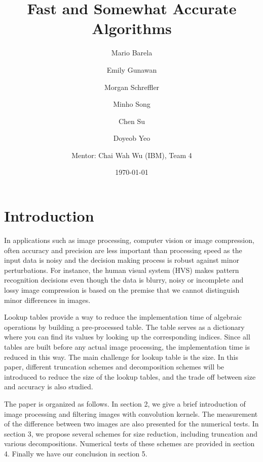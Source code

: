 \documentclass[12pt]{amsart}
\theoremstyle{definition}
\theoremstyle{remark}
\numberwithin{thm}{section}
\begin{document}
\title{Fast and Somewhat Accurate Algorithms}

\author[Barela]{Mario Barela}
\author[Gunawan]{Emily Gunawan}
\author[Schreffler]{Morgan Schreffler}
\author[Song]{Minho Song}
\author[Chen]{Chen Su}
\author[Yeo]{Doyeob Yeo}
\author[Wu]{Mentor: Chai Wah Wu (IBM), Team 4}

\address{Mathematical Modeling in Industry XIX (August 5-14, 2015)}

\date{\today}
\maketitle

\section{Introduction}%
In applications such as image processing, computer vision or image compression, often accuracy and precision are less important than processing speed as the input data is noisy and the decision making process is robust against minor perturbations. For instance, the human visual system (HVS) makes pattern recognition decisions even though the data is blurry, noisy or incomplete and lossy image compression is based on the premise that we cannot distinguish minor differences in images. 

Lookup tables provide a way to reduce the implementation time of algebraic operations by building a pre-processed table. The table serves as a dictionary where you can find its values by looking up the corresponding indices. Since all tables are built before any actual image processing, the implementation time is reduced in this way. The main challenge for lookup table is the size. In this paper, different truncation schemes and decomposition schemes will be introduced to reduce the size of the lookup tables, and the trade off between size and accuracy is also studied.

The paper is organized as follows. In section 2, we give a brief introduction of image processing and filtering images with convolution kernels. The measurement of the difference between two images are also presented for the numerical tests. In section 3, we propose several schemes for size reduction, including truncation and various decompositions. Numerical tests of these schemes are provided in section 4. Finally we have our conclusion in section 5. 
\end{document}
